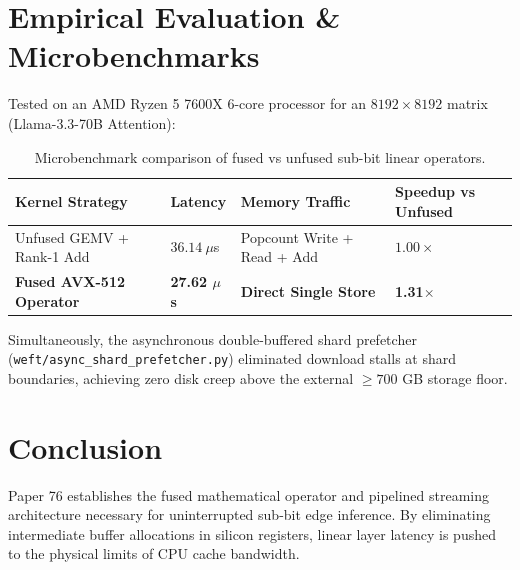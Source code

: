 \documentclass[11pt,a4paper]{article}
\begin{document}
\section{Empirical Evaluation \& Microbenchmarks}

Tested on an AMD Ryzen 5 7600X 6-core processor for an $8192 \times 8192$ matrix (Llama-3.3-70B Attention):

\begin{table}[h!]
\centering
\begin{tabular}{@{}llll@{}}
\toprule
\textbf{Kernel Strategy} & \textbf{Latency} & \textbf{Memory Traffic} & \textbf{Speedup vs Unfused} \\ \midrule
Unfused GEMV + Rank-1 Add & $36.14\ \mu$s & Popcount Write + Read + Add & $1.00\times$ \\
\textbf{Fused AVX-512 Operator} & \textbf{27.62 $\mu$s} & \textbf{Direct Single Store} & \textbf{1.31$\times$} \\ \bottomrule
\end{tabular}
\caption{Microbenchmark comparison of fused vs unfused sub-bit linear operators.}
\end{table}

Simultaneously, the asynchronous double-buffered shard prefetcher (\texttt{weft/async\_shard\_prefetcher.py}) eliminated download stalls at shard boundaries, achieving zero disk creep above the external $\ge 700$ GB storage floor.

\section{Conclusion}
Paper 76 establishes the fused mathematical operator and pipelined streaming architecture necessary for uninterrupted sub-bit edge inference. By eliminating intermediate buffer allocations in silicon registers, linear layer latency is pushed to the physical limits of CPU cache bandwidth.
\end{document}
